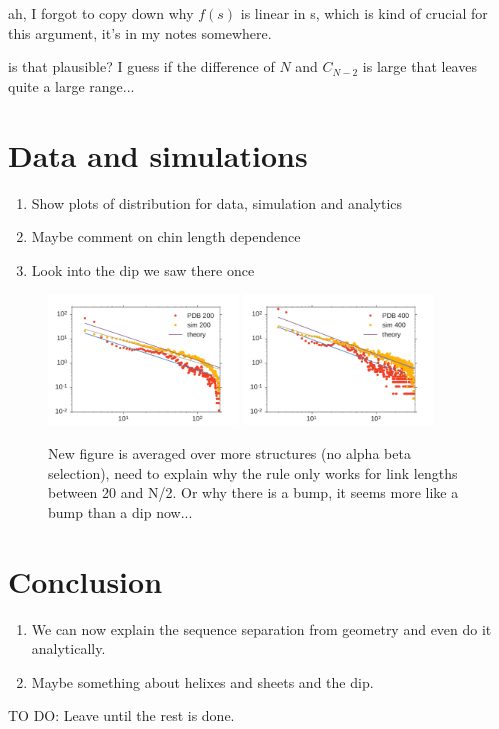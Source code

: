 \documentclass[reprint,amsmath,amssymb,rmp,onecolumn,notitlepage,11pt]{revtex4-1}
\newcommand{\red}[1]{\textcolor{red!80!black}{#1}}
\begin{document}
\red{ah, I forgot to copy down why $f(s)$ is linear in s, which is kind of crucial for this argument, it's in my notes somewhere.}

\red{is that plausible? I guess if the difference of $N$ and $C_{N-2}$ is large that leaves quite a large range...}

\section*{Data and simulations}
\begin{enumerate}
    \item Show plots of distribution for data, simulation and analytics
    \item Maybe comment on chin length dependence
    \item Look into the dip we saw there once
\end{enumerate}
\begin{figure}[h]
        \centering
	\includegraphics[width=0.45\textwidth]{both_dist_200.pdf}
	\includegraphics[width=0.45\textwidth]{both_dist_400.pdf}
        \caption{New figure is averaged over more structures (no alpha beta selection), need to explain why the rule only works for link lengths between 20 and N/2. Or why there is a bump, it seems more like a bump than a dip now...
        }
        \label{fig:time_scaling}
\end{figure}
\section*{Conclusion}
\begin{enumerate}
    \item We can now explain the sequence separation from geometry and even do it analytically.
    \item Maybe something about helixes and sheets and the dip.
\end{enumerate}
TO DO: Leave until the rest is done.
\end{document}
